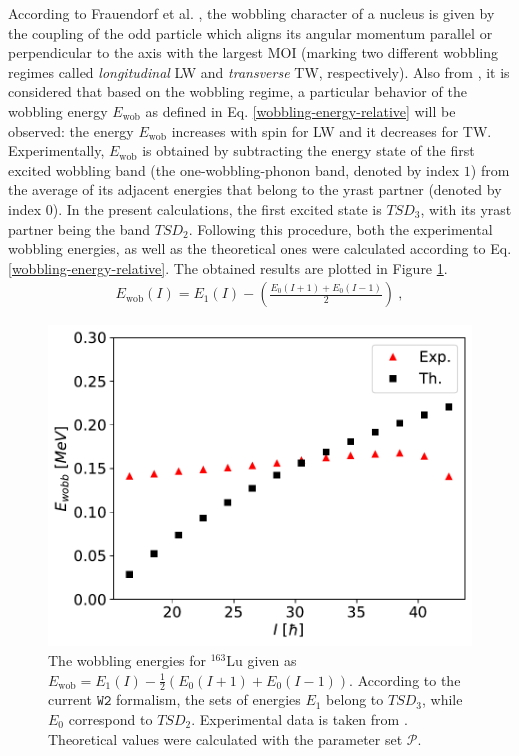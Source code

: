 \documentclass[myclassdoc,debug]{rjparticle}
\begin{document}
According to Frauendorf et al. \cite{frauendorf2014transverse}, the wobbling character of a nucleus is given by the coupling of the odd particle which aligns its angular momentum parallel or perpendicular to the axis with the largest MOI (marking two different wobbling regimes called \emph{longitudinal} LW and \emph{transverse} TW, respectively). Also from \cite{frauendorf2014transverse}, it is considered that based on the wobbling regime, a particular behavior of the wobbling energy $E_\text{wob}$ as defined in Eq. \ref{wobbling-energy-relative} will be observed: the energy $E_\text{wob}$ increases with spin for LW and it decreases for TW. Experimentally, $E_\text{wob}$ is obtained by subtracting the energy state of the first excited wobbling band (the one-wobbling-phonon band, denoted by index $1$) from the average of its adjacent energies that belong to the yrast partner (denoted by index $0$). In the present calculations, the first excited state is $TSD_3$, with its yrast partner being the band $TSD_2$. Following this procedure, both the experimental wobbling energies, as well as the theoretical ones were calculated according to Eq. \ref{wobbling-energy-relative}. The obtained results are plotted in Figure \ref{wobbling-energies_th_exp}.
\begin{align}
    E_\text{wob}(I)=E_{1}(I)-\left(\frac{E_0(I+1)+E_0(I-1)}{2}\right)\ ,
    \label{wobbling-energy-relative}
\end{align}

\begin{figure}
    \centering
    \includegraphics[scale=0.55]{figs/wobbling_energy_ThExp.pdf}
    \caption{The wobbling energies for $^{163}$Lu given as $E_\text{wob}=E_1(I)-\frac{1}{2}(E_0(I+1)+E_0(I-1))$. According to the current $\texttt{W2}$ formalism, the sets of energies $E_1$ belong to $TSD_3$, while $E_0$ correspond to $TSD_2$. Experimental data is taken from \cite{reich2010nuclear}. Theoretical values were calculated with the parameter set $\mathcal{P}$.}
    \label{wobbling-energies_th_exp}
\end{figure}
\end{document}
